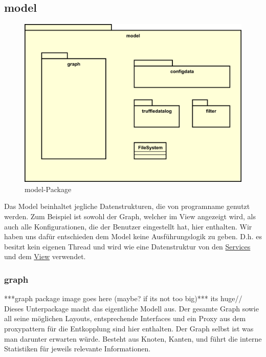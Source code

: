 \subsection{model}
\label{subsec:model}

\begin{figure}[H]
  \centering
  \includegraphics[width=\textwidth]{../diagramimages/model.png}
  \caption{model-Package}
\end{figure}

\medskip
Das Model beinhaltet jegliche Datenstrukturen, die von \gls{programname} genutzt
werden. Zum Beispiel ist sowohl der Graph, welcher im View angezeigt wird,
als auch alle Konfigurationen, die der Benutzer eingestellt hat, hier enthalten. Wir haben uns
dafür entschieden dem Model keine Ausführungslogik zu geben.
D.h. es besitzt kein eigenen Thread und wird wie eine Datenstruktur von den
\hyperref[subsec:service]{Services} und dem \hyperref[subsec:view]{View} verwendet.

    \subsubsection{graph}
    \label{subsubsec:graph}
    ***graph package image goes here (maybe? if its not too big)*** its huge//
    \newline
    \newline
    Dieses Unterpackage macht das eigentliche Modell aus. Der gesamte Graph sowie
    all seine möglichen Layouts, entsprechende Interfaces und ein Proxy aus dem
    \gls{proxypattern} für die Entkopplung sind hier enthalten. Der Graph selbst ist was man darunter erwarten würde.
    Besteht aus Knoten, Kanten, und führt die interne Statistiken für jeweils relevante Informationen.

